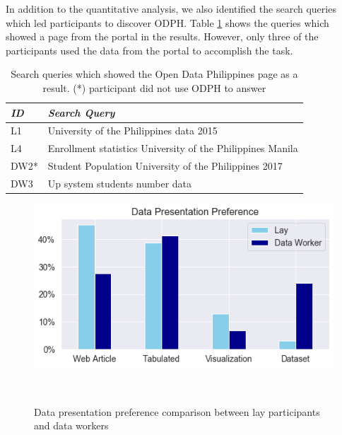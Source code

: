 \documentclass{sigchi}
\begin{document}
In addition to the quantitative analysis, we also identified the search queries which led participants to discover ODPH. Table \ref{tab:ODPHqueries} shows the queries which showed a page from the portal in the results. However, only three of the participants used the data from the portal to accomplish the task.

\begin{table}[t]
    \centering
    \begin{tabular}{l p{6.75cm}}
        \toprule
         \textit{ID} & \textit{Search Query} \\
         \midrule
         L1 & University of the Philippines data 2015 \\
         L4 & Enrollment statistics University of the Philippines Manila \\
         DW2* & Student Population University of the Philippines 2017 \\
         DW3 & Up system students number data \\
         \bottomrule
    \end{tabular}
    \caption{Search queries which showed the Open Data Philippines page as a result. (*) participant did not use ODPH to answer}
    \label{tab:ODPHqueries}
\end{table}

\begin{figure}
\centering
  \includegraphics[width=0.9\columnwidth]{figures/datapresentation.png}
  \caption{Data presentation preference comparison between lay participants and data workers}~\label{fig:datapresentation}
\end{figure}

\end{document}
